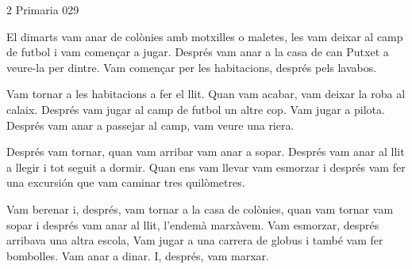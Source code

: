 \begin{news}
{2} %
{}
{}
{Primaria}
{029} %


El dimarts vam anar de colònies amb motxilles o maletes, les vam deixar al camp de futbol i vam començar a jugar. Després vam anar a la casa de can Putxet a veure-la per dintre. Vam començar per les habitacions, després pels lavabos. 

Vam tornar a les habitacions a fer el llit. Quan vam acabar, vam deixar la roba al calaix. Després vam jugar al camp de futbol un altre cop. Vam jugar a pilota. Després vam anar a passejar al camp, vam veure una riera.

Després vam tornar, quan vam arribar vam  anar a sopar. Després vam anar al llit a llegir i tot seguit a dormir. Quan ens vam llevar vam esmorzar i després vam fer una excursión que vam caminar tres quilòmetres. 

Vam berenar i, després, vam tornar a la casa de colònies, quan vam tornar vam sopar i després vam anar al llit, l’endemà marxàvem. Vam esmorzar, després arribava una altra escola, Vam jugar a una carrera de globus i també vam fer bombolles. 
Vam anar a dinar. I, després, vam marxar. 



\end{news}
